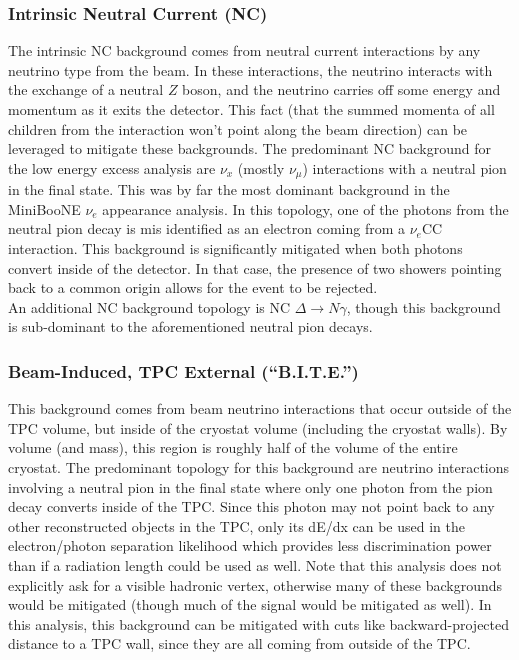 \subsubsection{Intrinsic Neutral Current (NC)}
The intrinsic NC background comes from neutral current interactions by any neutrino type from the beam. In these interactions, the neutrino interacts with the exchange of a neutral $Z$ boson, and the neutrino carries off some energy and momentum as it exits the detector. This fact (that the summed momenta of all children from the interaction won't point along the beam direction) can be leveraged to mitigate these backgrounds. The predominant NC background for the low energy excess analysis are $\nu_x$ (mostly $\nu_\mu$) interactions with a neutral pion in the final state. This was by far the most dominant background in the MiniBooNE $\nu_e$ appearance analysis. In this topology, one of the photons from the neutral pion decay is mis identified as an electron coming from a $\nu_e$CC interaction. This background is significantly mitigated when both photons convert inside of the detector. In that case, the presence of two showers pointing back to a common origin allows for the event to be rejected.\\

An additional NC background topology is NC $\Delta \rightarrow N\gamma$, though this background is sub-dominant to the aforementioned neutral pion decays.

\subsubsection{Beam-Induced, TPC External (``B.I.T.E.'')}\label{BITE_physics_section}
This background comes from beam neutrino interactions that occur outside of the TPC volume, but inside of the cryostat volume (including the cryostat walls). By volume (and mass), this region is roughly half of the volume of the entire cryostat. The predominant topology for this background are neutrino interactions involving a neutral pion in the final state where only one photon from the pion decay converts inside of the TPC. Since this photon may not point back to any other reconstructed objects in the TPC, only its dE/dx can be used in the electron/photon separation likelihood which provides less discrimination power than if a radiation length could be used as well. Note that this analysis does not explicitly ask for a visible hadronic vertex, otherwise many of these backgrounds would be mitigated (though much of the signal would be mitigated as well). In this analysis, this background can be mitigated with cuts like backward-projected distance to a TPC wall, since they are all coming from outside of the TPC.

